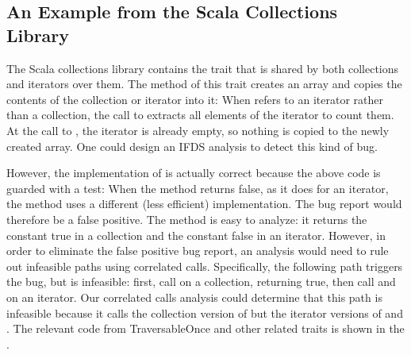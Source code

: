 \subsection{An Example from the Scala Collections Library}\label{sec:collex}
The Scala collections library contains the trait  that is
shared by both collections and iterators over them. 
The  method of this trait
creates an array and copies the contents of the collection or iterator into it:
When  refers to an iterator rather than a collection, the call to 
extracts all elements of the iterator to count them.
 At the call to ,
the iterator is already empty, so nothing is copied to the newly created array.
One could design an IFDS analysis to detect this kind of bug.

However, the implementation of  is actually correct because the above
code is guarded with a test: 
When the  method returns false, as it does for
an iterator, the  method uses a different
(less efficient) implementation. The bug report would therefore be a false positive. 
The  method is easy to analyze: it returns the constant
true in a collection and the constant false in an iterator. However, in order
to eliminate the false positive bug report, an analysis would need to rule out infeasible
paths using correlated calls. Specifically, the following path triggers the bug, but
is infeasible: first, call  on a collection, returning
true, then call  and  on an iterator. Our correlated
calls analysis could determine that this path is infeasible because it calls the
collection version of  but the iterator versions of
 and .
The relevant code from \textsf{TraversableOnce} and other related traits is shown
in the \reportOrAppendix.
